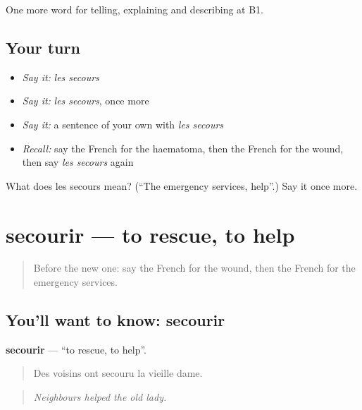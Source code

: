 \begin{grammarlens}[title={What you've built}]
One more word for telling, explaining and describing at B1.
\end{grammarlens}

\subsection*{Your turn}
\begin{itemize}
\raggedright
  \item \emph{Say it:} \emph{les secours}
  \item \emph{Say it:} \emph{les secours}, once more
  \item \emph{Say it:} a sentence of your own with \emph{les secours}
  \item \emph{Recall:} say the French for the haematoma, then the French for the wound, then say \emph{les secours} again
\end{itemize}

\begin{tcolorbox}[breakable,colback=teal!4,colframe=teal!35!black,title={Before you move on}]
What does les secours mean? (\textquotedblleft{}The emergency services, help\textquotedblright{}.) Say it once more.
\end{tcolorbox}
\section[secourir]{secourir — to rescue, to help}

\label{lesson:FR-C300-secourir}



\begin{quote}
Before the new one: say the French for the wound, then the French for the emergency services.
\end{quote}

\subsection*{You'll want to know: secourir}
\textbf{secourir} — \textquotedblleft{}to rescue, to help\textquotedblright{}.

\begin{quote}
Des voisins ont secouru la vieille dame.
\end{quote}

\begin{quote}
\emph{Neighbours helped the old lady.}
\end{quote}

